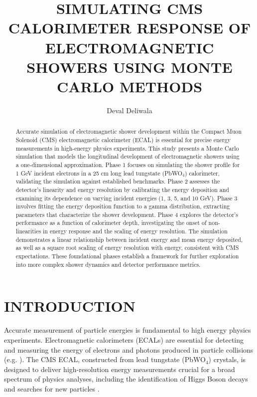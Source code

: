 \documentclass[twocolumn]{aastex631}
\begin{document}
\title{SIMULATING CMS CALORIMETER RESPONSE OF ELECTROMAGNETIC SHOWERS USING
MONTE CARLO METHODS}

\author{Deval Deliwala}


\begin{abstract}
Accurate simulation of electromagnetic shower development within the Compact
Muon Solenoid (CMS) electromagnetic calorimeter (ECAL) is essential for precise
energy measurements in high-energy physics experiments. This study presents a
Monte Carlo simulation that models the longitudinal development of
electromagnetic showers using a one-dimensional approximation. Phase 1 focuses
on simulating the shower profile for 1 GeV incident electrons in a 25 cm long lead
tungstate (PbWO\(_4\)) calorimeter, validating the simulation against
established benchmarks. Phase 2 assesses the detector's linearity and energy
resolution by calibrating the energy deposition and examining its dependence on
varying incident energies (1, 3, 5, and 10 GeV). Phase 3 involves fitting the
energy deposition function to a gamma distribution, extracting parameters that
characterize the shower development. Phase 4 explores the detector's performance
as a function of calorimeter depth, investigating the onset of
non-linearities in energy response and the scaling of energy resolution. The
simulation demonstrates a linear relationship between incident energy and mean
energy deposited, as well as a square root scaling of energy resolution with
energy, consistent with CMS expectations. These foundational phases establish a
framework for further exploration into more complex shower dynamics and detector
performance metrics.
\end{abstract}

\section{INTRODUCTION}
Accurate measurement of particle energies is fundamental to high energy physics
experiments. Electromagnetic calorimeters (ECALs) are essential for detecting
and measuring the energy of electrons and photons produced in particle
collisions (e.g. \cite{PDG2022}). The CMS ECAL, constructed from lead tungstate
(PbWO$_\text{4}$) crystals, is designed to deliver high-resolution energy measurements
crucial for a broad spectrum of physics analyses, including the identification
of Higgs Boson decays and searches for new particles \citep{Brown2007}.
\end{document}
